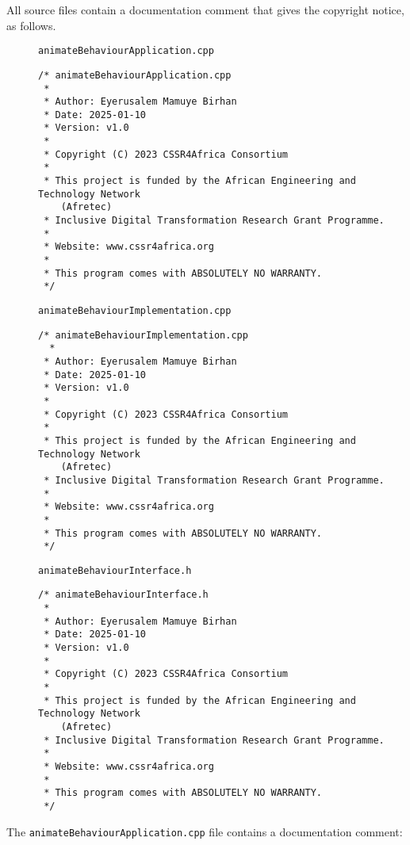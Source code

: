 \documentclass{CSSRforAfrica}
\newcommand{\blank}{~\\}
\newcommand{\checkboxChecked}{\fbox{\ding{51}}} %
\begin{document}
\noindent All source files contain a documentation comment that gives the copyright notice, as follows.
 
\begin{description}

\item[\checkboxChecked] {\small \verb+animateBehaviourApplication.cpp+}  
{\small \begin{verbatim}
/* animateBehaviourApplication.cpp
 *
 * Author: Eyerusalem Mamuye Birhan
 * Date: 2025-01-10
 * Version: v1.0
 * 
 * Copyright (C) 2023 CSSR4Africa Consortium
 * 
 * This project is funded by the African Engineering and Technology Network 
    (Afretec) 
 * Inclusive Digital Transformation Research Grant Programme. 
 *
 * Website: www.cssr4africa.org
 *
 * This program comes with ABSOLUTELY NO WARRANTY.
 */
\end{verbatim} }

\item[\checkboxChecked]  {\small \verb+animateBehaviourImplementation.cpp+}  
{\small \begin{verbatim}
/* animateBehaviourImplementation.cpp
  *
 * Author: Eyerusalem Mamuye Birhan
 * Date: 2025-01-10
 * Version: v1.0
 * 
 * Copyright (C) 2023 CSSR4Africa Consortium
 * 
 * This project is funded by the African Engineering and Technology Network 
    (Afretec) 
 * Inclusive Digital Transformation Research Grant Programme. 
 *
 * Website: www.cssr4africa.org
 *
 * This program comes with ABSOLUTELY NO WARRANTY.
 */
\end{verbatim} }

\newpage
\item[\checkboxChecked] {\small \verb+animateBehaviourInterface.h+}   
{\small \begin{verbatim}
/* animateBehaviourInterface.h
 *
 * Author: Eyerusalem Mamuye Birhan
 * Date: 2025-01-10
 * Version: v1.0
 * 
 * Copyright (C) 2023 CSSR4Africa Consortium
 * 
 * This project is funded by the African Engineering and Technology Network 
    (Afretec) 
 * Inclusive Digital Transformation Research Grant Programme. 
 *
 * Website: www.cssr4africa.org
 *
 * This program comes with ABSOLUTELY NO WARRANTY.
 */
\end{verbatim} }

\end{description} 

\noindent The {\small \verb+animateBehaviourApplication.cpp+} file contains a documentation comment:
\end{document}
